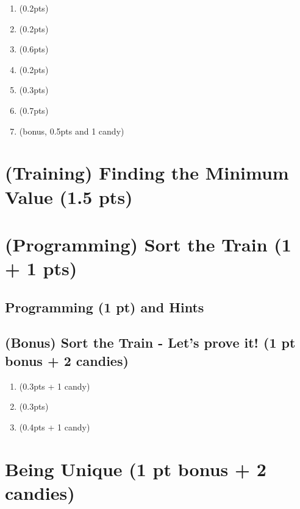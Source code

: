 \documentclass{article}[12pt]
\begin{document}
\begin{enumerate}
  \item (0.2pts) 
  \item (0.2pts) 
  \item (0.6pts) 
  \item (0.2pts) 
  \item (0.3pts) 
  \item (0.7pts) 
  \item (bonus, 0.5pts and 1 candy) 
\end{enumerate}
\newpage

\newpage

\section{(Training) Finding the Minimum Value (1.5 pts)}


\section{(Programming) Sort the Train (1 + 1 pts)}


\subsection{Programming (1 pt) and Hints}

\subsection{(Bonus) Sort the Train - Let's prove it! (1 pt bonus + 2 candies)}

\begin{enumerate}
  \item (0.3pts + 1 candy) 
  \item (0.3pts) 
  \item (0.4pts + 1 candy) 
\end{enumerate}


\section{Being Unique (1 pt bonus + 2 candies)}
\end{document}

